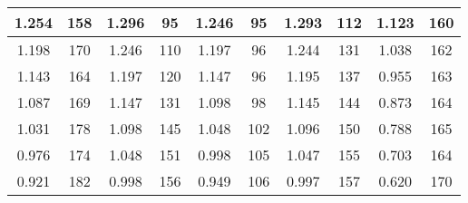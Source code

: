 \begin{table}[H]
\begin{tabular}{|cc|cc|cc|cc|cc|}
		\multicolumn{1}{|c|}{1.254}          & 158                                & \multicolumn{1}{c|}{1.296}          & 95                                & \multicolumn{1}{c|}{1.246}           & 95                    & \multicolumn{1}{c|}{1.293}      & 112                   & \multicolumn{1}{c|}{1.123}      & 160                   \\ \hline
		\multicolumn{1}{|c|}{1.198}          & 170                                & \multicolumn{1}{c|}{1.246}          & 110                               & \multicolumn{1}{c|}{1.197}           & 96                    & \multicolumn{1}{c|}{1.244}      & 131                   & \multicolumn{1}{c|}{1.038}      & 162                   \\ \hline
		\multicolumn{1}{|c|}{1.143}          & 164                                & \multicolumn{1}{c|}{1.197}          & 120                               & \multicolumn{1}{c|}{1.147}           & 96                    & \multicolumn{1}{c|}{1.195}      & 137                   & \multicolumn{1}{c|}{0.955}      & 163                   \\ \hline
		\multicolumn{1}{|c|}{1.087}          & 169                                & \multicolumn{1}{c|}{1.147}          & 131                               & \multicolumn{1}{c|}{1.098}           & 98                    & \multicolumn{1}{c|}{1.145}      & 144                   & \multicolumn{1}{c|}{0.873}      & 164                   \\ \hline
		\multicolumn{1}{|c|}{1.031}          & 178                                & \multicolumn{1}{c|}{1.098}          & 145                               & \multicolumn{1}{c|}{1.048}           & 102                   & \multicolumn{1}{c|}{1.096}      & 150                   & \multicolumn{1}{c|}{0.788}      & 165                   \\ \hline
		\multicolumn{1}{|c|}{0.976}          & 174                                & \multicolumn{1}{c|}{1.048}          & 151                               & \multicolumn{1}{c|}{0.998}           & 105                   & \multicolumn{1}{c|}{1.047}      & 155                   & \multicolumn{1}{c|}{0.703}      & 164                   \\ \hline
		\multicolumn{1}{|c|}{0.921}          & 182                                & \multicolumn{1}{c|}{0.998}          & 156                               & \multicolumn{1}{c|}{0.949}           & 106                   & \multicolumn{1}{c|}{0.997}      & 157                   & \multicolumn{1}{c|}{0.620}      & 170                   \\ \hline

\end{tabular}
\end{table}
